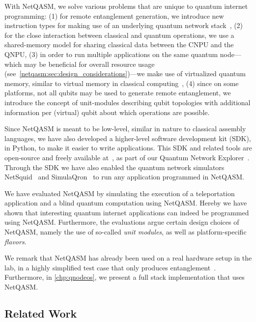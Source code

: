 With \ac{NetQASM}, we solve various problems that are unique to quantum internet programming:
    (1) for remote entanglement generation, we introduce new instruction types for making use of an underlying quantum network stack~\cite{dahlberg2019linklayer, kozlowski2020networklayer},
    (2) for the close interaction between classical and quantum operations, we use a shared-memory model for sharing classical data between the \ac{CNPU} and the \ac{QNPU},
    (3) in order to run multiple applications on the same quantum node---which may be beneficial for overall resource usage (see~\cref{netqasm:sec:design_considerations})---we make use of virtualized quantum memory, similar to virtual memory in classical computing~\cite{arpaci2018operating},
    (4) since on some platforms, not all qubits may be used to generate remote entanglement, we introduce the concept of unit-modules describing qubit topologies with additional information per (virtual) qubit about which operations are possible.

Since \ac{NetQASM} is meant to be low-level, similar in nature to classical assembly languages, we have also developed a higher-level software development kit (SDK), in Python, to make it easier to write applications.
This SDK and related tools are open-source and freely available at~\cite{git_netqasm}, as part of our Quantum Network Explorer~\cite{qne_website}.
Through the SDK we have also enabled the quantum network simulators NetSquid~\cite{coopmans2021netsquid} and SimulaQron~\cite{dahlberg2018simulaqron} to run any application programmed in \ac{NetQASM}.

We have evaluated \ac{NetQASM} by simulating the execution of a teleportation application and a blind quantum computation using \ac{NetQASM}.
Hereby we have shown that interesting quantum internet applications can indeed be programmed using \ac{NetQASM}.
Furthermore, the evaluations argue certain design choices of \ac{NetQASM}, namely the use of so-called \textit{unit modules}, as well as platform-specific
\textit{flavors}.

We remark that \ac{NetQASM} has already been used on a real hardware setup in the lab, in a highly simplified test case that only produces entanglement~\cite{pompili2021experimental}.
Furthermore, in \cref{chp:qnodeos}, we present a full stack implementation that uses \ac{NetQASM}.


\subsection{Related Work}
\label{netqasm:sec:related}

